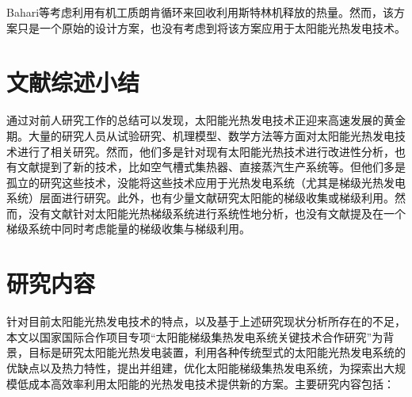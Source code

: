 Bahari等\cite{Bahari2016}考虑利用有机工质朗肯循环来回收利用斯特林机释放的热量。然而，该方案只是一个原始的设计方案，也没有考虑到将该方案应用于太阳能光热发电技术。


\section{文献综述小结}
通过对前人研究工作的总结可以发现，太阳能光热发电技术正迎来高速发展的黄金期。大量的研究人员从试验研究、机理模型、数学方法等方面对太阳能光热发电技术进行了相关研究。然而，他们多是针对现有太阳能光热技术进行改进性分析，也有文献提到了新的技术，比如空气槽式集热器、直接蒸汽生产系统等。但他们多是孤立的研究这些技术，没能将这些技术应用于光热发电系统（尤其是梯级光热发电系统）层面进行研究。此外，也有少量文献研究太阳能的梯级收集或梯级利用。然而，没有文献针对太阳能光热梯级系统进行系统性地分析，也没有文献提及在一个梯级系统中同时考虑能量的梯级收集与梯级利用。

\section{研究内容}
\label{sec:researchContent}

针对目前太阳能光热发电技术的特点，以及基于上述研究现状分析所存在的不足，本文以国家国际合作项目专项“太阳能梯级集热发电系统关键技术合作研究”为背景，目标是研究太阳能光热发电装置，利用各种传统型式的太阳能光热发电系统的优缺点以及热力特性，提出并组建，优化太阳能梯级集热发电系统，为探索出大规模低成本高效率利用太阳能的光热发电技术提供新的方案。主要研究内容包括：

